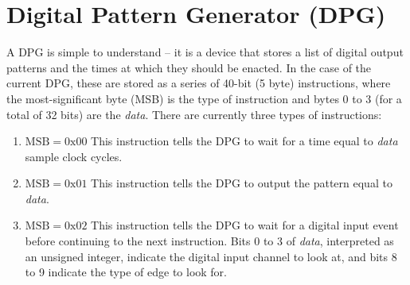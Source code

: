 \documentclass[]{article}
\begin{document}
\section{Digital Pattern Generator (DPG)}
\label{sec:dpg}
A DPG is simple to understand -- it is a device that stores a list of digital output patterns and the times at which they should be enacted.  In the case of the current DPG, these are stored as a series of 40-bit (5 byte) instructions, where the most-significant byte (MSB) is the type of instruction and bytes 0 to 3 (for a total of 32 bits) are the \emph{data}.  There are currently three types of instructions:
\begin{enumerate}
	\item $\mathrm{MSB} = 0\mathrm{x}00$ This instruction tells the DPG to wait for a time equal to \emph{data} sample clock cycles.
	\item $\mathrm{MSB} = 0\mathrm{x}01$ This instruction tells the DPG to output the pattern equal to \emph{data}.
	\item $\mathrm{MSB} = 0\mathrm{x}02$ This instruction tells the DPG to wait for a digital input event before continuing to the next instruction.  Bits 0 to 3 of \emph{data}, interpreted as an unsigned integer, indicate the digital input channel to look at, and bits 8 to 9 indicate the type of edge to look for.
\end{enumerate}
\end{document}
